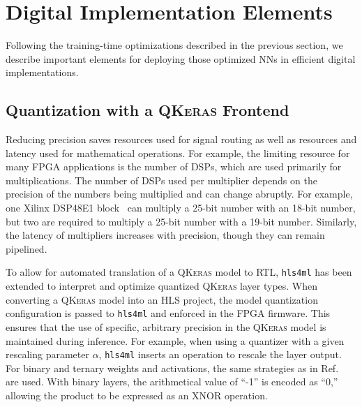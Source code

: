 \documentclass[tinyml]{acmart}
\newcommand{\hlsfml}{\texttt{hls4ml}\xspace}
\begin{document}

\section{Digital Implementation Elements}
\label{sec:impl}

Following the training-time optimizations described in the previous section, we describe important elements for deploying those optimized NNs in efficient digital implementations.

\subsection{Quantization with a \textsc{QKeras} Frontend}

Reducing precision saves resources used for signal routing as well as resources and latency used for mathematical operations.
For example, the limiting resource for many FPGA applications is the number of DSPs, which are used primarily for multiplications.
The number of DSPs used per multiplier depends on the precision of the numbers being multiplied and can change abruptly.
For example, one Xilinx DSP48E1 block~\cite{dsp48e1} can multiply a 25-bit number with an 18-bit number,
but two are required to multiply a 25-bit number with a 19-bit number.
Similarly, the latency of multipliers increases with precision, though they can remain pipelined.

To allow for automated translation of a \textsc{QKeras} model to RTL, \hlsfml has been extended to interpret and optimize quantized \textsc{QKeras} layer types.
When converting a \textsc{QKeras} model into an HLS project, the model quantization configuration is passed to \hlsfml and enforced in the FPGA firmware.
This ensures that the use of specific, arbitrary precision in the \textsc{QKeras} model is maintained during inference.
For example, when using a quantizer with a given rescaling parameter $\alpha$, \hlsfml inserts an operation to rescale the layer output.
For binary and ternary weights and activations, the same strategies as in Ref.~\cite{DiGuglielmo:2020eqx} are used.
With binary layers, the  arithmetical value of ``-1'' is encoded as ``0,'' allowing the product to be expressed as an XNOR operation.
\end{document}
